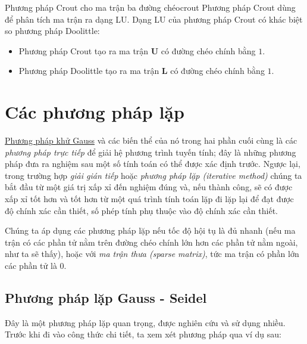 \documentclass[../../Lectures]{subfiles}
\begin{document}
\begin{cmethod}{Phương pháp Crout cho ma trận ba đường chéo}{crout}
    Phương pháp Crout dùng để phân tích ma trận ra dạng LU. Dạng LU của phương
    pháp Crout có khác biệt so phương pháp Doolittle:
    \begin{itemize}
        \item Phương pháp Crout tạo ra ma trận \(\bm{U}\) có đường chéo chính
            bằng \(1\).
        \item Phương pháp Doolittle tạo ra ma trận \(\bm{L}\) có đường chéo
            chính bằng \(1\).
    \end{itemize}
\end{cmethod}



\section{Các phương pháp lặp}

\hyperref[method:gauss_elimination]{Phương pháp khử Gauss} và các biến thể của
nó trong hai phần cuối cùng là các \emph{phương pháp trực tiếp} để giải hệ
phương trình tuyến tính; đây là những phương pháp đưa ra nghiệm sau một số tính
toán có thể được xác định trước. Ngược lại, trong trường hợp \emph{giải gián
tiếp} hoặc \emph{phương pháp lặp (iterative method)} chúng ta bắt đầu từ một giá
trị xấp xỉ đến nghiệm đúng và, nếu thành công, sẽ có được xấp xỉ tốt hơn và tốt
hơn từ một quá trình tính toán lặp đi lặp lại để đạt được độ chính xác cần
thiết, số phép tính phụ thuộc vào độ chính xác cần thiết.

Chúng ta áp dụng các phương pháp lặp nếu tốc độ hội tụ là đủ nhanh (nếu ma trận
có các phần tử nằm trên đường chéo chính lớn hơn các phần tử nằm ngoài, như ta
sẽ thấy), hoặc với \emph{ma trận thưa (sparse matrix)}, tức ma trận có phần lớn
các phần tử là \(0\).

\subsection{Phương pháp lặp Gauss - Seidel}

Đây là một phương pháp lặp quan trọng, được nghiên cứu và sử dụng nhiều. Trước
khi đi vào công thức chi tiết, ta xem xét phương pháp qua ví dụ sau:
\end{document}
